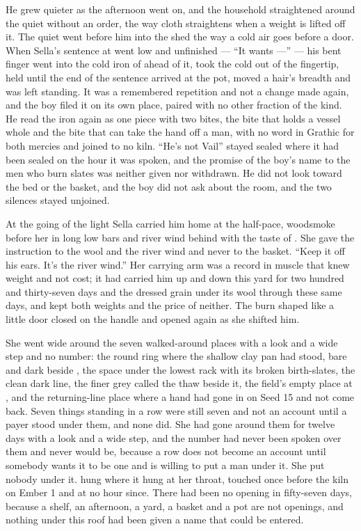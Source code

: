 He grew quieter as the afternoon went on, and the household straightened around the quiet without an order, the way cloth straightens when a weight is lifted off it. The quiet went before him into the shed the way a cold air goes before a door. When Sella's sentence at  went low and unfinished — “It wants —” — his bent finger went into the cold iron of  ahead of it, took the cold out of the fingertip, held until the end of the sentence arrived at the pot, moved a hair's breadth and was left standing. It was a remembered repetition and not a change made again, and the boy filed it on its own place, paired with no other fraction of the kind. He read the iron again as one piece with two bites, the bite that holds a vessel whole and the bite that can take the hand off a man, with no word in Grathic for both mercies and joined to no kiln. “He's not Vail” stayed sealed where it had been sealed on the hour it was spoken, and the promise of the boy's name to the men who burn slates was neither given nor withdrawn. He did not look toward the bed or the basket, and the boy did not ask about the room, and the two silences stayed unjoined.

\scenebreak

At the going of the light Sella carried him home at the half-pace, woodsmoke before her in long low bars and river wind behind with the taste of . She gave the instruction to the wool and the river wind and never to the basket. “Keep it off his ears. It's the river wind.” Her carrying arm was a record in muscle that knew weight and not cost; it had carried him up and down this yard for two hundred and thirty-seven days and the dressed grain under its wool through these same days, and kept both weights and the price of neither. The burn shaped like a little door closed on the handle and opened again as she shifted him.

She went wide around the seven walked-around places with a look and a wide step and no number: the round ring where the shallow clay pan had stood,  bare and dark beside , the space under the lowest rack with its broken birth-slates, the clean dark line, the finer grey called the thaw beside it, the field's empty place at , and the returning-line place where a hand had gone in on Seed 15 and not come back. Seven things standing in a row were still seven and not an account until a payer stood under them, and none did. She had gone around them for twelve days with a look and a wide step, and the number had never been spoken over them and never would be, because a row does not become an account until somebody wants it to be one and is willing to put a man under it. She put nobody under it.  hung where it hung at her throat, touched once before the kiln on Ember 1 and at no hour since. There had been no opening in fifty-seven days, because a shelf, an afternoon, a yard, a basket and a pot are not openings, and nothing under this roof had been given a name that could be entered.

